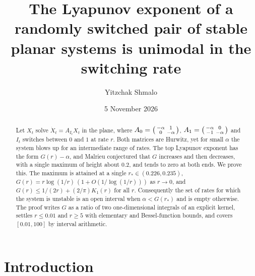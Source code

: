 \documentclass[11pt]{amsart}
\title[Unimodality of a switched Lyapunov exponent]{The Lyapunov exponent of a randomly switched pair of stable planar systems is unimodal in the switching rate}
\author{Yitzchak Shmalo}
\date{5 November 2026}
\theoremstyle{remark}
\numberwithin{equation}{section}
\begin{document}
\begin{abstract}
Let $X_t$ solve $\dot X_t=A_{I_t}X_t$ in the plane, where $A_0=\begin{psmallmatrix}-\alpha&1\\0&-\alpha\end{psmallmatrix}$, $A_1=\begin{psmallmatrix}-\alpha&0\\-1&-\alpha\end{psmallmatrix}$ and $I_t$ switches between $0$ and $1$ at rate $r$. Both matrices are Hurwitz, yet for small $\alpha$ the system blows up for an intermediate range of rates. The top Lyapunov exponent has the form $G(r)-\alpha$, and Malrieu conjectured that $G$ increases and then decreases, with a single maximum of height about $0.2$, and tends to zero at both ends. We prove this. The maximum is attained at a single $r_*\in(0.226,0.235)$, $G(r)=r\log(1/r)\,(1+O(1/\log(1/r)))$ as $r\to0$, and $G(r)\le 1/(2r)+(2/\pi)K_1(r)$ for all $r$. Consequently the set of rates for which the system is unstable is an open interval when $\alpha<G(r_*)$ and is empty otherwise. The proof writes $G$ as a ratio of two one-dimensional integrals of an explicit kernel, settles $r\le 0.01$ and $r\ge5$ with elementary and Bessel-function bounds, and covers $[0.01,100]$ by interval arithmetic.
\end{abstract}
\maketitle

\section{Introduction}\label{sec:intro}
\end{document}
